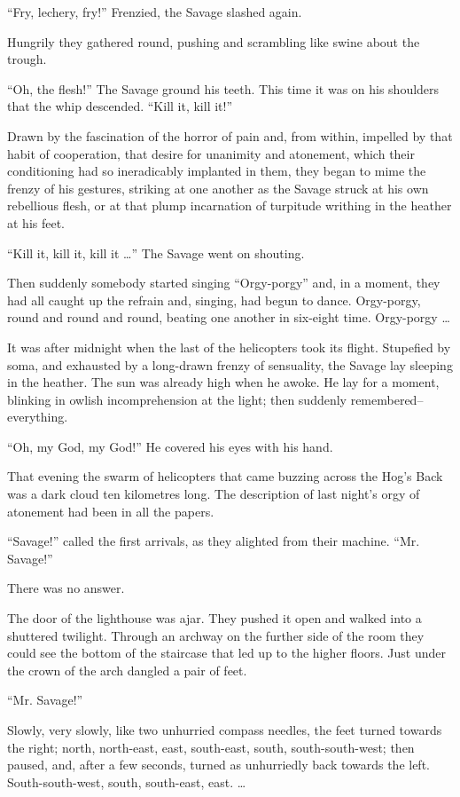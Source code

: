 \documentclass[12pt]{report}
\begin{document}
``Fry, lechery, fry!'' Frenzied, the Savage slashed again.

Hungrily they gathered round, pushing and scrambling like swine about
the trough.

``Oh, the flesh!'' The Savage ground his teeth. This time it was on his
shoulders that the whip descended. ``Kill it, kill it!''

Drawn by the fascination of the horror of pain and, from within,
impelled by that habit of cooperation, that desire for unanimity and
atonement, which their conditioning had so ineradicably implanted in
them, they began to mime the frenzy of his gestures, striking at one
another as the Savage struck at his own rebellious flesh, or at that
plump incarnation of turpitude writhing in the heather at his feet.

``Kill it, kill it, kill it \ldots{}'' The Savage went on shouting.

Then suddenly somebody started singing ``Orgy-porgy'' and, in a moment,
they had all caught up the refrain and, singing, had begun to dance.
Orgy-porgy, round and round and round, beating one another in six-eight
time. Orgy-porgy \ldots{}

It was after midnight when the last of the helicopters took its flight.
Stupefied by soma, and exhausted by a long-drawn frenzy of sensuality,
the Savage lay sleeping in the heather. The sun was already high when he
awoke. He lay for a moment, blinking in owlish incomprehension at the
light; then suddenly remembered--everything.

``Oh, my God, my God!'' He covered his eyes with his hand.

That evening the swarm of helicopters that came buzzing across the Hog's
Back was a dark cloud ten kilometres long. The description of last
night's orgy of atonement had been in all the papers.

``Savage!'' called the first arrivals, as they alighted from their
machine. ``Mr. Savage!''

There was no answer.

The door of the lighthouse was ajar. They pushed it open and walked into
a shuttered twilight. Through an archway on the further side of the room
they could see the bottom of the staircase that led up to the higher
floors. Just under the crown of the arch dangled a pair of feet.

``Mr. Savage!''

Slowly, very slowly, like two unhurried compass needles, the feet turned
towards the right; north, north-east, east, south-east, south,
south-south-west; then paused, and, after a few seconds, turned as
unhurriedly back towards the left. South-south-west, south, south-east,
east. \ldots{}
\end{document}
